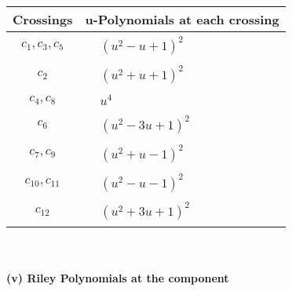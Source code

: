 \documentclass[1p]{elsarticle_modified}
\theoremstyle{definition}
\begin{document}
\begin{tabular}{m{50pt}|m{274pt}}
Crossings & \hspace{64pt}u-Polynomials at each crossing \\
\hline $$\begin{aligned}c_{1},c_{3},c_{5}\end{aligned}$$&$\begin{aligned}
&(u^2- u+1)^2
\end{aligned}$\\
\hline $$\begin{aligned}c_{2}\end{aligned}$$&$\begin{aligned}
&(u^2+u+1)^2
\end{aligned}$\\
\hline $$\begin{aligned}c_{4},c_{8}\end{aligned}$$&$\begin{aligned}
&u^4
\end{aligned}$\\
\hline $$\begin{aligned}c_{6}\end{aligned}$$&$\begin{aligned}
&(u^2-3 u+1)^2
\end{aligned}$\\
\hline $$\begin{aligned}c_{7},c_{9}\end{aligned}$$&$\begin{aligned}
&(u^2+u-1)^2
\end{aligned}$\\
\hline $$\begin{aligned}c_{10},c_{11}\end{aligned}$$&$\begin{aligned}
&(u^2- u-1)^2
\end{aligned}$\\
\hline $$\begin{aligned}c_{12}\end{aligned}$$&$\begin{aligned}
&(u^2+3 u+1)^2
\end{aligned}$\\
\hline
\end{tabular}\\~\\
\newpage\renewcommand{\arraystretch}{1}
\flushleft \textbf{(v) Riley Polynomials at the component}\newline \\
\end{document}
